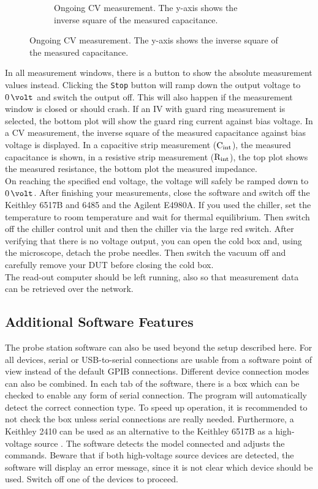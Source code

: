 \documentclass[a4paper]{article}
\begin{document}
\begin{figure}[hbtp]
\begin{subfigure}[t]{0.475\textwidth}
\caption[Running CV Measurement]{Ongoing CV measurement. The y-axis shows the inverse square of the measured capacitance.}
\label{fig:cvmeas}
\end{subfigure}
\end{figure}

In all measurement windows, there is a button to show the absolute measurement values instead.
Clicking the {\tt Stop} button will ramp down the output voltage to $0\,\volt$ and switch the output off.
This will also happen if the measurement window is closed or should crash.
If an IV with guard ring measurement is selected, the bottom plot will show the guard ring current against bias voltage.
In a CV measurement, the inverse square of the measured capacitance against bias voltage is displayed.
In a capacitive strip measurement (${\rm C_{int}}$), the measured capacitance is shown, in a resistive strip measurement (${\rm R_{int}}$), the top plot shows the measured resistance, the bottom plot the measured impedance.\\

On reaching the specified end voltage, the voltage will safely be ramped down to $0\,\volt$.
After finishing your measurements, close the software and switch off the Keithley 6517B and 6485 and the Agilent E4980A.
If you used the chiller, set the temperature to room temperature and wait for thermal equilibrium.
Then switch off the chiller control unit and then the chiller via the large red switch.
After verifying that there is no voltage output, you can open the cold box and, using the microscope, detach the probe needles.
Then switch the vacuum off and carefully remove your DUT before closing the cold box.\\

The read-out computer should be left running, also so that measurement data can be retrieved over the network.\\

\subsection{Additional Software Features}
\label{sec:additional}

The probe station software can also be used beyond the setup described here.
For all devices, serial or USB-to-serial connections are usable from a software point of view instead of the default GPIB connections.
Different device connection modes can also be combined.
In each tab of the software, there is a box which can be checked to enable any form of serial connection.
The program will automatically detect the correct connection type.
To speed up operation, it is recommended to not check the box unless serial connections are really needed.
Furthermore, a Keithley 2410 can be used as an alternative to the Keithley 6517B as a high-voltage source .
The software detects the model connected and adjusts the commands.
Beware that if both high-voltage source devices are detected, the software will display an error message, since it is not clear which device should be used.
Switch off one of the devices to proceed.\\
\end{document}
